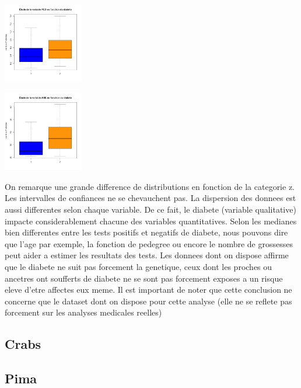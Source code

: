 \documentclass[10pt]{article}
\begin{document}
\begin{center}
\begin{minipage}[t]{0.3\textwidth}
	\end{minipage}
	\newline
	\begin{minipage}[t]{0.3\textwidth}
		\includegraphics[width=35mm]{Figures/Pima/bxp_z_ped.png}
	\end{minipage}
	\begin{minipage}[t]{0.3\textwidth}
		\includegraphics[width=35mm]{Figures/Pima/bxp_z_age.png}
	\end{minipage}
\end{center}

On remarque une grande difference de distributions en fonction de la categorie z. Les intervalles de confiances ne se chevauchent pas. La dispersion des donnees est aussi differentes selon chaque variable. De ce fait, le diabete (variable  qualitative) impacte considerablement chacune des variables quantitatives. 
Selon les medianes bien differentes entre les tests positifs et negatifs de diabete, nous pouvons dire que l'age par exemple, la fonction de pedegree ou encore le nombre de grossesses peut aider a estimer les resultats des tests.
Les donnees dont on dispose affirme que le diabete ne suit pas forcement la genetique, ceux dont les proches ou ancetres ont soufferts de diabete ne se sont pas forcement exposes a un risque eleve d'etre affectes eux meme. Il est important de noter que cette conclusion ne concerne que le dataset dont on dispose pour cette analyse (elle ne se reflete pas forcement sur les analyses medicales reelles)

\subsection{Crabs}

\subsection{Pima}
\end{document}
